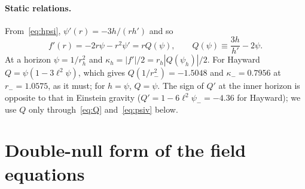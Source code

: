 \documentclass[11pt]{article}
\begin{document}
\paragraph{Static relations.} From~\eqref{eq:hpsi}, $\psi'(r)=-3h/(rh')$ and so
\begin{equation}
f'(r)=-2r\psi-r^{2}\psi'=rQ(\psi),\qquad Q(\psi)\equiv\frac{3h}{h'}-2\psi .
\label{eq:Q}
\end{equation}
At a horizon $\psi=1/r_h^{2}$ and $\kappa_h=|f'|/2=r_h|Q(\psi_h)|/2$. For Hayward $Q=\psi(1-3\ell^{2}\psi)$, which gives $Q(1/r_-^{2})=-1.5048$ and $\kappa_-=0.7956$ at $r_-=1.0575$, as it must; for $h=\psi$, $Q=\psi$. The sign of $Q'$ at the inner horizon is opposite to that in Einstein gravity ($Q'=1-6\ell^{2}\psi_-=-4.36$ for Hayward); we use $Q$ only through~\eqref{eq:Q} and~\eqref{eq:psiv} below.

\section{Double-null form of the field equations}
\label{sec:eqs}
\end{document}
